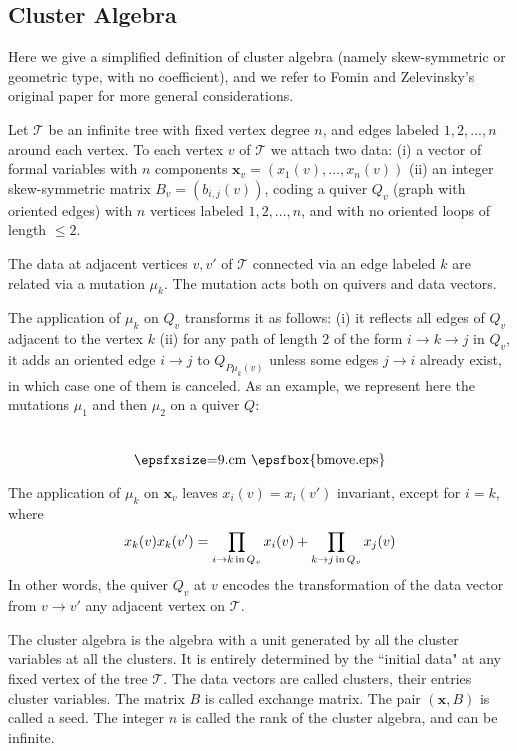 \documentclass[12pt]{amsart}
\numberwithin{equation}{section}
\begin{document}
\subsection{Cluster Algebra}

Here we give a simplified definition of cluster algebra (namely skew-symmetric or geometric type, 
with no coefficient), and we refer to Fomin and Zelevinsky's original paper\cite{FZI} for more general considerations. 

Let $\mathcal T$ be an infinite tree with fixed vertex degree $n$, and edges labeled $1,2,...,n$ around each vertex.
To each vertex $v$ of $\mathcal T$ we attach two data:
(i) a vector of formal variables with $n$ components ${\mathbf x}_v=(x_{1}(v),...,x_{n}(v))$
(ii) an integer skew-symmetric matrix $B_v=(b_{i,j}(v))$, coding a quiver $Q_v$ (graph with oriented edges)
with $n$ vertices labeled $1,2,...,n$, and with no oriented loops of length $\leq 2$.

The data at adjacent vertices $v,v'$ of $\mathcal T$ connected via an edge labeled $k$ are related via a mutation $\mu_k$.
The mutation acts both on quivers and data vectors.

The application of $\mu_k$ on $Q_v$ transforms it as follows: (i) it reflects all
edges of $Q_v$ adjacent to the vertex $k$ (ii) for any path of length $2$ of the form $i\to k\to j$ in $Q_v$,
it adds an oriented edge $i\to j$ to $Q_{P\mu_k(v)}$ unless some edges $j\to i$ already exist, in which case
one of them is canceled. As an example, we represent here the mutations $\mu_1$ and then $\mu_2$
on a quiver $Q$:
$$ \raisebox{-1.cm}{\hbox{\epsfxsize=9.cm \epsfbox{bmove.eps}}} 
$$

The application of $\mu_k$ on ${\mathbf x}_v$ leaves $x_i(v)=x_i(v')$ invariant, except for $i=k$,
where 
\begin{equation}\label{mutarul} x_k(v)x_k(v')=\prod_{i\to k\, {\rm in }\, Q_v} x_i(v) +\prod_{k\to j\, {\rm in }\, Q_v} x_j(v)
\end{equation}
In other words, the quiver $Q_v$ at $v$ encodes the transformation of the data vector from $v\to v'$
any adjacent vertex on $\mathcal T$.

The cluster algebra is the algebra with a unit generated by all the cluster variables at all the clusters.
It is entirely determined by the ``initial data" at any fixed vertex of the tree $\mathcal T$.
The data vectors are called clusters, their entries cluster variables. The matrix $B$ is called exchange matrix.
The pair $({\mathbf x},B)$ is called a seed.
The integer $n$ is called the rank of the cluster algebra, and can be infinite.
\end{document}
